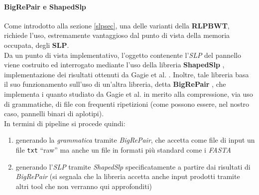 \paragraph{BigRePair e ShapedSlp}
\label{subslp}
Come introdotto alla sezione \ref{slpsec}, una delle varianti della
\textbf{RLPBWT}, richiede l'uso, estremamente vantaggioso dal punto di vista
della memoria occupata, degli \textbf{SLP}.\\
Da un punto di vista implementativo, l'oggetto contenente l'\textit{SLP} del
pannello viene costruito ed interrogato mediante l'uso della libreria
\textbf{ShapedSlp} \cite{shapedslp}, implementazione dei risultati ottenuti da
Gagie et al. \cite{slpgagie}. Inoltre, tale libreria basa il suo funzionamento
sull'uso di un'altra libreria, detta \textbf{BigRePair} \cite{bigrepair}, che
implementa i quanto studiato da Gagie et al. \cite{rpair} in merito alla
compressione, via uso di grammatiche, di file con frequenti ripetizioni (come
possono essere, nel nostro caso, pannelli binari di aplotipi).\\
In termini di pipeline si procede quindi:
\begin{enumerate}
  \item generando la \textit{grammatica} tramite \textit{BigRePair}, che accetta
  come file di input un file \texttt{txt} ``raw'' ma anche un file in formati
  più standard come i \textit{FASTA}
  \item generando l'\textit{SLP} tramite \textit{ShapedSlp} specificatamente a
  partire dai risultati di \textit{BigRePair} (si segnala che la libreria
  accetta anche input prodotti tramite altri tool che non verranno qui
  approfonditi) 
\end{enumerate}

